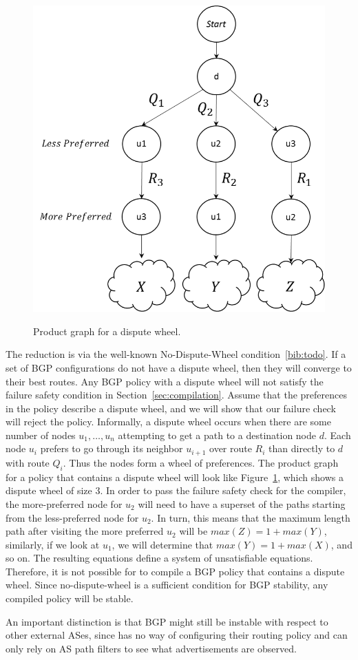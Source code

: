 \begin{figure}[t!]
\includegraphics[width=\columnwidth]{figures/dispute-wheel}
\label{fig:dispute-wheel}
\caption{Product graph for a dispute wheel.}
\end{figure}

The reduction is via the well-known No-Dispute-Wheel condition~\ref{bib:todo}. If a set of BGP configurations do not have a dispute wheel, then they will converge to their best routes. Any BGP policy with a dispute wheel will not satisfy the failure safety condition in Section~\ref{sec:compilation}. Assume that the preferences in the policy describe a dispute wheel, and we will show that our failure check will reject the policy. Informally, a dispute wheel occurs when there are some number of nodes $u_1, \dots, u_n$ attempting to get a path to a destination node $d$. Each node $u_i$ prefers to go through its neighbor $u_{i+1}$ over route $R_i$ than directly to $d$ with route $Q_i$. Thus the nodes form a wheel of preferences. The product graph for a policy that contains a dispute wheel will look like Figure~\ref{fig:dispute-wheel}, which shows a dispute wheel of size 3. In order to pass the failure safety check for the compiler, the more-preferred node for $u_2$ will need to have a superset of the paths starting from the less-preferred node for $u_2$. In turn, this means that the maximum length path after visiting the more preferred $u_2$ will be $max(Z) = 1 + max(Y)$, similarly, if we look at $u_1$, we will determine that $max(Y) = 1 + max(X)$, and so on. The resulting equations define a system of unsatisfiable equations. Therefore, it is not possible for \sysname to compile a BGP policy that contains a dispute wheel. Since no-dispute-wheel is a sufficient condition for BGP stability, any compiled \sysname policy will be stable.

An important distinction is that BGP might still be instable with respect to other external ASes, since \sysname has no way of configuring their routing policy and can only rely on AS path filters to see what advertisements are observed.

